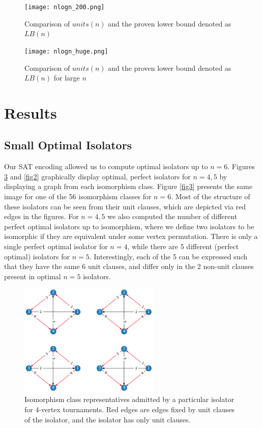 \documentclass[a4paper,UKenglish,cleveref, autoref, thm-restate]{lipics-v2021}
\begin{document}
\begin{figure}
\texttt{[image: nlogn\_200.png]}
\caption{Comparison of $units(n)$ and the proven lower bound denoted as $LB(n)$} \label{nlogn_200}
\end{figure}

\begin{figure}
\texttt{[image: nlogn\_huge.png]}
\caption{Comparison of $units(n)$ and the proven lower bound denoted as $LB(n)$ for large $n$} \label{nlogn_huge}
\end{figure}

\section{Results}

\subsection{Small Optimal Isolators}

Our SAT encoding allowed us to compute optimal isolators up to $n=6$. Figures \ref{fig1} and \ref{fig2} graphically display optimal, perfect isolators for $n=4,5$ by displaying a graph from each isomorphism class. Figure \ref{fig3} presents the same image for one of the 56 isomorphism classes for $n=6$. Most of the structure of these isolators can be seen from their unit clauses, which are depicted via red edges in the figures. For $n=4,5$ we also computed the number of different perfect optimal isolators up to isomorphism, where we define two isolators to be isomorphic if they are equivalent under some vertex permutation. There is only a single perfect optimal isolator for $n=4$, while there are 5 different (perfect optimal) isolators for $n=5$. Interestingly, each of the 5 can be expressed such that they have the same 6 unit clauses, and differ only in the 2 non-unit clauses present in optimal $n=5$ isolators.

\begin{figure}
\includegraphics[width=0.6\textwidth]{iso_4.png}
\caption{Isomorphism class representatives admitted by a particular isolator for 4-vertex tournaments. Red edges are edges fixed by unit clauses of the isolator, and the isolator has only unit clauses.} \label{fig1}
\end{figure}
\end{document}
